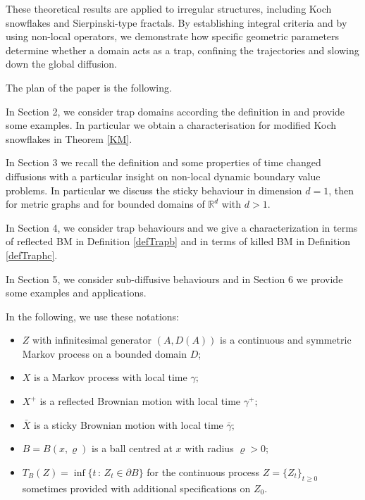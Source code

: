 \documentclass[[11pt,a4paper,reqno]{article}
\numberwithin{equation}{section}
\begin{document}
These theoretical results are applied to irregular  structures, including Koch snowflakes  and Sierpinski-type fractals.
 By establishing integral criteria and  by using non-local operators, we demonstrate how specific geometric parameters determine whether a domain acts as a trap, confining the trajectories and slowing down the global diffusion.


The plan of the paper is the following.


In Section 2, we consider trap domains according the definition in \cite{BCM} and provide some examples. In particular  we obtain a characterisation for  modified Koch snowflakes in Theorem \ref{KM}.


In Section 3 we recall  the definition and some properties of time changed diffusions with a particular insight 
on non-local dynamic boundary value problems. In particular we 
discuss the sticky behaviour in dimension $d=1$, then  for metric graphs and for bounded domains of $\mathbb{R}^d$ with $d>1$.



In Section 4, we  consider trap behaviours and we give a characterization in terms of reflected BM  in  Definition \ref{defTrapb}  and  in terms of killed BM in  Definition \ref{defTraphc}.





In Section 5, we  consider sub-diffusive behaviours and  in Section 6 we provide some examples and applications.


\bigskip

In the following, we use these notations:
\begin{itemize}
    \item $Z$ with infinitesimal generator $(A, D(A))$ is a continuous and symmetric Markov process on a bounded domain $D$;
     \item $X$ is a Markov process with local time $\gamma;$
    \item  $X^+$ is a reflected  Brownian motion  with local time $\gamma^+;$
    \item  $\bar{X}$ is a sticky Brownian motion  with local time $\bar{\gamma};$
    \item  $B=B(x, \varrho)$ is a ball centred at $x$ with radius $\varrho>0;$
    \item  $T_B(Z) = \inf\{t\,:\, Z_t \in \partial B\}$ for the continuous process $Z=\{Z_t\}_{t \geq 0}$ sometimes provided with additional specifications on $Z_0.$
\end{itemize}
\end{document}
